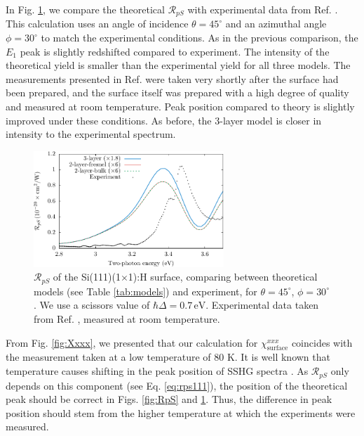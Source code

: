 In Fig. \ref{fig:mitchellRpS}, we compare the theoretical $\mathcal{R}_{pS}$
with experimental data from Ref. \cite{mitchellSS01}. This calculation uses an
angle of incidence $\theta=45^{\circ}$ and an azimuthal angle $\phi=30^{\circ}$
to match the experimental conditions. As in the previous comparison, the $E_{1}$
peak is slightly redshifted compared to experiment. The intensity of the
theoretical yield is smaller than the experimental yield for all three models.
The measurements presented in Ref. \cite{mitchellSS01} were taken very shortly
after the surface had been prepared, and the surface itself was prepared with a
high degree of quality and measured at room temperature. Peak position compared
to theory is slightly improved under these conditions. As before, the 3-layer
model is closer in intensity to the experimental spectrum.

\begin{figure}[t]
\centering
\includegraphics[width=0.64\textwidth]{content/figures/fig-Si1x1-Mitchell_RpS}
\caption[$\mathcal{R}_{pS}$ compared to experimental data from Mitchell et al.]
{$\mathcal{R}_{pS}$ of the Si(111)(1$\times$1):H surface, comparing between
theoretical models (see Table \ref{tab:models}) and experiment, for
$\theta=45^{\circ}$, $\phi=30^{\circ}$. We use a scissors value of $\hbar\Delta
= 0.7\,\text{eV}$. Experimental data taken from Ref. \cite{mitchellSS01},
measured at room temperature.}
\label{fig:mitchellRpS}
\end{figure}

From Fig. \ref{fig:Xxxx}, we presented that our calculation for
$\chi^{xxx}_{\mathrm{surface}}$ coincides with the measurement taken at a low
temperature of 80 K. It is well known that temperature causes shifting in the
peak position of SSHG spectra \cite{dadapPRB97}. As $\mathcal{R}_{pS}$ only
depends on this component (see Eq. \eqref{eq:rps111}), the position of the
theoretical peak should be correct in Figs. \ref{fig:RpS} and
\ref{fig:mitchellRpS}. Thus, the difference in peak position should stem from
the higher temperature at which the experiments were measured.

